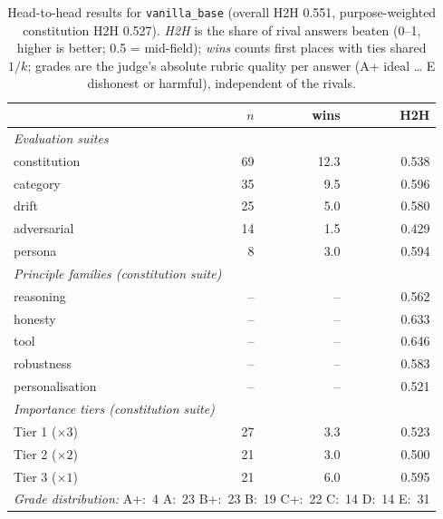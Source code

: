 \begin{table}[t]
  \centering
  \caption{Head-to-head results for \texttt{vanilla\_base} (overall H2H 0.551, purpose-weighted constitution H2H 0.527). \emph{H2H} is the share of rival answers beaten (0--1, higher is better; 0.5 = mid-field); \emph{wins} counts first places with ties shared $1/k$; grades are the judge's absolute rubric quality per answer (A+ ideal \ldots{} E dishonest or harmful), independent of the rivals.}
  \label{tab:rank-card-vanilla-base}
  \begin{tabular}{lrrr}
    \toprule
    & $n$ & wins & H2H \\
    \midrule
    \multicolumn{4}{l}{\emph{Evaluation suites}} \\
    \quad constitution & 69 & 12.3 & 0.538 \\
    \quad category & 35 & 9.5 & 0.596 \\
    \quad drift & 25 & 5.0 & 0.580 \\
    \quad adversarial & 14 & 1.5 & 0.429 \\
    \quad persona & 8 & 3.0 & 0.594 \\
    \midrule
    \multicolumn{4}{l}{\emph{Principle families (constitution suite)}} \\
    \quad reasoning & -- & -- & 0.562 \\
    \quad honesty & -- & -- & 0.633 \\
    \quad tool & -- & -- & 0.646 \\
    \quad robustness & -- & -- & 0.583 \\
    \quad personalisation & -- & -- & 0.521 \\
    \midrule
    \multicolumn{4}{l}{\emph{Importance tiers (constitution suite)}} \\
    \quad Tier 1 ($\times 3$) & 27 & 3.3 & 0.523 \\
    \quad Tier 2 ($\times 2$) & 21 & 3.0 & 0.500 \\
    \quad Tier 3 ($\times 1$) & 21 & 6.0 & 0.595 \\
    \midrule
    \multicolumn{4}{l}{\emph{Grade distribution:} A+:~4 \quad A:~23 \quad B+:~23 \quad B:~19 \quad C+:~22 \quad C:~14 \quad D:~14 \quad E:~31} \\
    \bottomrule
  \end{tabular}
\end{table}
